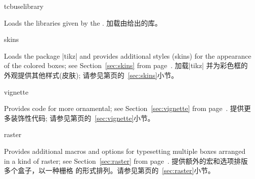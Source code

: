 \begin{docCommand}{tcbuselibrary}{}
\begin{stripedbox}
Loads the libraries given by the .
\tcblower
加载由\makebox[0pt]{~}\makebox[0pt]{~}给出的库。  
\end{stripedbox} 

\begin{dispListing}
\end{dispListing}


\end{docCommand}  

\begin{docTcbKey}[library]{skins}{}{}
\begin{stripedbox}
Loads the package |tikz| %
and provides additional styles (skins) for the appearance of the colored boxes; 
see  Section~\ref{sec:skins} from page~\pageref{sec:skins}.
\tcblower
加载|tikz|\makebox[0pt]{~}%
并为彩色框的外观提供其他样式(皮肤);
请参见第\pageref{sec:skins}页的~\ref{sec:skins}小节。
\end{stripedbox}
\end{docTcbKey}

\begin{docTcbKey}[library]{vignette}{}{}
\begin{stripedbox}
Provides code for more ornamental; see
Section~\ref{sec:vignette} from page~\pageref{sec:vignette}.
\tcblower
提供更多装饰性代码; 请参见第\pageref{sec:vignette}页的~\ref{sec:vignette}小节。

\end{stripedbox}
\end{docTcbKey}

\begin{docTcbKey}[library]{raster}{}{}
\begin{stripedbox}
Provides additional macros and options for typesetting 
multiple boxes arranged in a kind of raster;
see Section~\ref{sec:raster} from page~\pageref{sec:raster}.
\tcblower
提供额外的宏和选项排版多个盒子，以一种栅格\footnotemark%
的形式排列。请参见第\pageref{sec:raster}页的~\ref{sec:raster}小节。
\end{stripedbox}
\end{docTcbKey}


